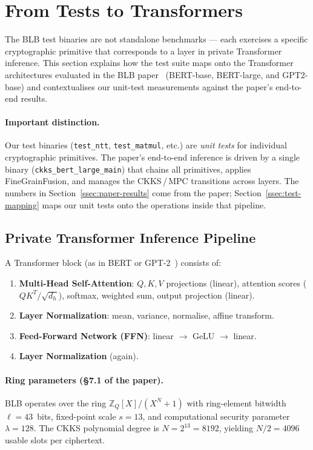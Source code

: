 \section{From Tests to Transformers}\label{sec:transformer}

The BLB test binaries are not standalone benchmarks --- each exercises a specific cryptographic primitive that corresponds to a layer in private Transformer inference.
This section explains how the test suite maps onto the Transformer architectures evaluated in the BLB paper~\cite{xu2025breaking} (BERT-base, BERT-large, and GPT2-base) and contextualises our unit-test measurements against the paper's end-to-end results.

\paragraph{Important distinction.}
Our test binaries (\texttt{test\_ntt}, \texttt{test\_matmul}, etc.) are \emph{unit tests} for individual cryptographic primitives.
The paper's end-to-end inference is driven by a single binary (\texttt{ckks\_bert\_large\_main}) that chains all primitives, applies FineGrainFusion, and manages the CKKS\,/\,MPC transitions across layers.
The numbers in Section~\ref{ssec:paper-results} come from the paper; Section~\ref{ssec:test-mapping} maps our unit tests onto the operations inside that pipeline.

\subsection{Private Transformer Inference Pipeline}

A Transformer block (as in BERT or GPT-2~\cite{xu2025breaking}) consists of:
\begin{enumerate}[nosep]
  \item \textbf{Multi-Head Self-Attention}: $Q, K, V$ projections (linear), attention scores ($QK^T / \sqrt{d_h}$), softmax, weighted sum, output projection (linear).
  \item \textbf{Layer Normalization}: mean, variance, normalise, affine transform.
  \item \textbf{Feed-Forward Network (FFN)}: linear $\to$ GeLU $\to$ linear.
  \item \textbf{Layer Normalization} (again).
\end{enumerate}

\paragraph{Ring parameters (\S7.1 of the paper).}
BLB operates over the ring $\mathbb{Z}_Q[X]/(X^N+1)$ with
ring-element bitwidth $\ell = 43$~bits,
fixed-point scale $s = 13$,
and computational security parameter $\lambda = 128$.
The CKKS polynomial degree is $N = 2^{13} = 8192$, yielding $N/2 = 4096$ usable slots per ciphertext.

